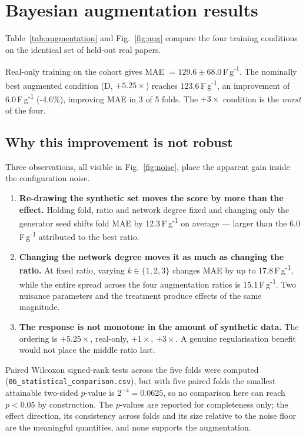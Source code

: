 \section{Bayesian augmentation results}\label{sec:augres}

Table~\ref{tab:augmentation} and Fig.~\ref{fig:aug} compare the four training conditions
on the identical set of held-out real papers.

Real-only training on the cohort gives MAE
$= 129.6 \pm 68.0$\,F\,g\textsuperscript{-1}. The
nominally best augmented condition (D, $+5.25\times$) reaches
123.6\,F\,g\textsuperscript{-1}, an improvement of
6.0\,F\,g\textsuperscript{-1}
(-4.6\%), improving MAE in
3 of 5 folds. The $+3\times$ condition
is the \emph{worst} of the four.

\subsection{Why this improvement is not robust}
Three observations, all visible in Fig.~\ref{fig:noise}, place the apparent gain inside the
configuration noise.

\begin{enumerate}
\item \textbf{Re-drawing the synthetic set moves the score by more than the effect.}
Holding fold, ratio and network degree fixed and changing only the generator seed shifts
fold MAE by 12.3\,F\,g\textsuperscript{-1} on average --- larger than the
6.0\,F\,g\textsuperscript{-1} attributed to the best ratio.
\item \textbf{Changing the network degree moves it as much as changing the ratio.} At fixed
ratio, varying $k \in \{1,2,3\}$ changes MAE by up to
17.8\,F\,g\textsuperscript{-1}, while the entire spread across the four
augmentation ratios is 15.1\,F\,g\textsuperscript{-1}. Two nuisance
parameters and the treatment produce effects of the same magnitude.
\item \textbf{The response is not monotone in the amount of synthetic data.} The ordering
is $+5.25\times$, real-only, $+1\times$, $+3\times$. A genuine regularisation benefit would
not place the middle ratio last.
\end{enumerate}

Paired Wilcoxon signed-rank tests across the five folds were computed
(\texttt{06\_statistical\_comparison.csv}), but with five paired folds the smallest
attainable two-sided $p$-value is $2^{-4} = 0.0625$, so no comparison here can reach
$p<0.05$ by construction. The $p$-values are reported for completeness only; the effect
direction, its consistency across folds and its size relative to the noise floor are the
meaningful quantities, and none supports the augmentation.


